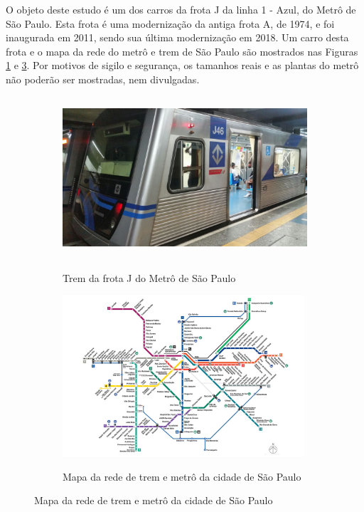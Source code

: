 \documentclass[acronym,symbols]{fei}
\begin{document}
O objeto deste estudo é um dos carros da frota J da linha 1 - Azul, do Metrô de São Paulo. Esta frota é uma modernização da antiga frota A, de 1974, e foi inaugurada em 2011, sendo sua última modernização em 2018. Um carro desta frota e o mapa da rede do metrô e trem de São Paulo são mostrados nas Figuras \ref{fig:Trem_da_Frota_J_J46} e \ref{fig:mapa-da-rede-metro-0124-abre}. Por motivos de sigilo e segurança, os tamanhos reais e as plantas do metrô não poderão ser mostradas, nem divulgadas.

\begin{figure}[!htp]
    \begin{subfigure}{0.5\textwidth}
        \caption{Trem da frota J do Metrô de São Paulo}
        \includegraphics[width=0.9\linewidth, height=6cm]{Imagens/Trem_da_Frota_J_J46} 
        \label{fig:Trem_da_Frota_J_J46}
    \end{subfigure}
    \begin{subfigure}{0.5\textwidth}
        \caption{Mapa da rede de trem e metrô da cidade de São Paulo}
        \includegraphics[width=0.9\linewidth, height=6cm]{Imagens/mapa-da-rede-metro-0124-abre.jpg}
        \label{fig:mapa-da-rede-metro-0124-abre}
    \end{subfigure}
\end{figure}
\end{document}

